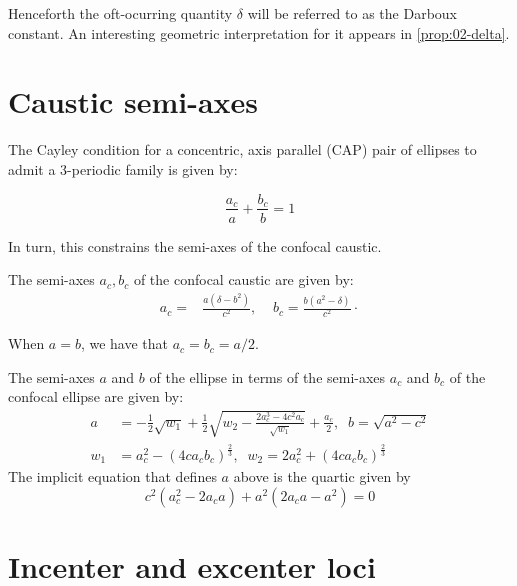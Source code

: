 Henceforth the oft-ocurring quantity $\delta$ will be referred to as the Darboux constant. An interesting geometric interpretation for it appears in \cref{prop:02-delta}.


\section{Caustic semi-axes}
\label{sec:02-caustic}
The Cayley condition for a concentric, axis parallel (CAP) pair of ellipses to admit a 3-periodic family is given by:

\begin{equation} \frac{a_c}{a}+\frac{b_c}{b}=1
\label{eqn:n3-cayley}
\end{equation}

In turn, this constrains the semi-axes of the confocal caustic.

\begin{proposition}
The semi-axes $a_c,b_c$ of the confocal caustic are given by:
\begin{align*}
a_c=&\frac{a\left(\delta-{b}^{2}\right)}{c^2},\;\;\;\;
b_c=\frac{b\left({a}^{2}-\delta\right)}{c^2}\cdot
\end{align*}
\label{prop:02-n3-caustic}
\end{proposition}

When $a=b$, we have that $a_c=b_c=a/2$.

\begin{proposition}
The semi-axes $a$ and $b$ of the ellipse in terms of the semi-axes $a_c$ and $b_c$ of the confocal ellipse are given by:
\begin{align*}
a&= -\frac{1}{2} \sqrt{w_1} + \frac{1}{2} \sqrt{ w_2 -\frac{ 2 a_c^3 - 4 c^2a_c}{\sqrt{w_1}} } +\frac{a_c}{2},\;\; b=\sqrt{a^2-c^2}\\
w_1&=a_c^2-(4 c a_c b_c)^{\frac{2}{3}},\;\; w_2=2 a_c^2+ (4 c a_c b_c)^{\frac{2}{3}}
\end{align*}
The implicit equation that defines $a$ above is the quartic  given by
\[c^2( a_c^2   - 2   a_c   a )+ a^2(2a_c a  - a^2)=0\]
\label{prop:02-caustic-to-billiard}
\end{proposition}

\section{Incenter and excenter loci}
\label{sec:02-inc-exc-loci}


